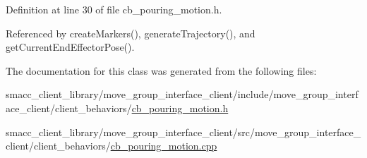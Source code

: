 Definition at line 30 of file cb\+\_\+pouring\+\_\+motion.\+h.



Referenced by create\+Markers(), generate\+Trajectory(), and get\+Current\+End\+Effector\+Pose().



The documentation for this class was generated from the following files\+:\begin{DoxyCompactItemize}
\item 
smacc\+\_\+client\+\_\+library/move\+\_\+group\+\_\+interface\+\_\+client/include/move\+\_\+group\+\_\+interface\+\_\+client/client\+\_\+behaviors/\hyperlink{cb__pouring__motion_8h}{cb\+\_\+pouring\+\_\+motion.\+h}\item 
smacc\+\_\+client\+\_\+library/move\+\_\+group\+\_\+interface\+\_\+client/src/move\+\_\+group\+\_\+interface\+\_\+client/client\+\_\+behaviors/\hyperlink{cb__pouring__motion_8cpp}{cb\+\_\+pouring\+\_\+motion.\+cpp}\end{DoxyCompactItemize}
